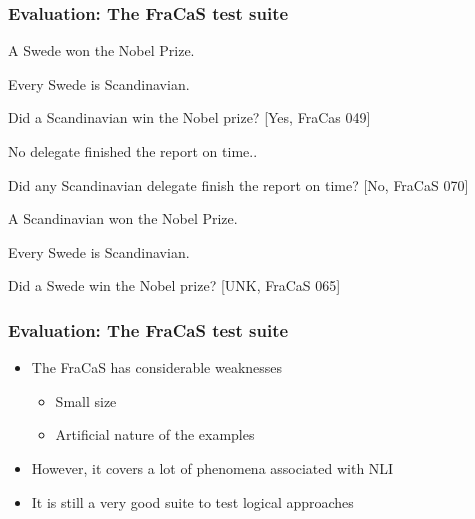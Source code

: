 \documentclass[11pt]{beamer}
\begin{document}
\begin{frame}[fragile]
	\frametitle{Evaluation: The FraCaS test suite}
	
	 
		
		\begin{exe}
			\ex
			A Swede won the Nobel Prize.
			
			Every Swede is  Scandinavian.
			
			Did a Scandinavian win the Nobel prize? [Yes, FraCas 049]
		\end{exe}
		
		
		
		 \begin{exe}
		 	\ex
		 	No delegate finished the report on time..
		 	
		 	Did any Scandinavian delegate finish the report on time? [No, FraCaS 070]
		 \end{exe}
		 
		 
		 \begin{exe}
		 	\ex
		 	A Scandinavian won the Nobel Prize.
		 	
		 	Every Swede is  Scandinavian.
		 	
		 	Did a Swede win the Nobel prize? [UNK, FraCaS 065]\end{exe}



\end{frame}

\begin{frame}[fragile]
	\frametitle{Evaluation: The FraCaS test suite}
	
	\begin{itemize}
		
		\item The FraCaS has considerable weaknesses
		
		\begin{itemize}
			
			\item Small size
			
			\item Artificial nature of the
			examples

\end{itemize}

\item However, it covers a lot of phenomena associated with NLI

\item It is still a very good suite to test logical approaches\end{itemize}
\end{frame}
\end{document}
